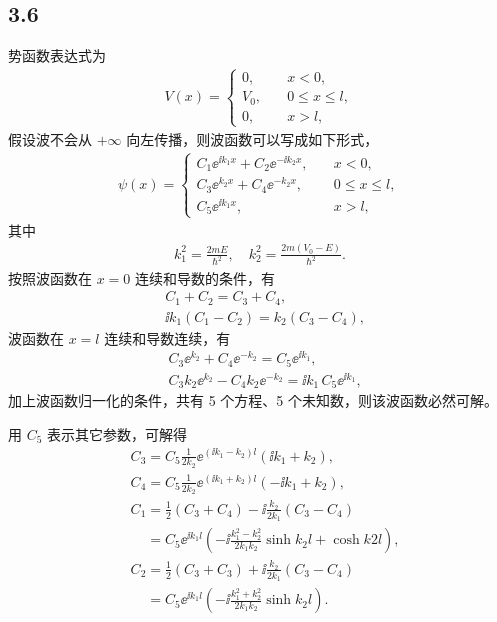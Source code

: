 \subsection{3.6}
势函数表达式为
\begin{align}
    V(x) = \begin{cases}
        0, \quad &x <0,\\
        V_0, \quad &0\leq x \leq l, \\
        0, \quad &x>l,
    \end{cases}
\end{align}
假设波不会从 $+\infty$ 向左传播，则波函数可以写成如下形式，
\begin{align}
    \psi(x) = \begin{cases}
        C_1 \ee^{\ii k_1 x} + C_2 \ee^{-\ii k_2 x}, \quad &x < 0, \\
        C_3 \ee^{k_2 x} + C_4 \ee^{-k_2 x}, \quad& 0\leq x \leq l,\\
        C_5 \ee^{\ii k_1 x}, \quad&x>l,
    \end{cases}
\end{align}
其中
\begin{align}
    k_1^2 = \frac{2mE}{\hbar^2}, \quad k_2^2 = \frac{2m(V_0 - E)}{\hbar^2}. 
\end{align}
按照波函数在 $x=0$ 连续和导数的条件，有
\begin{align}
    &C_1 + C_2 = C_3 + C_4, \\
    &\ii k_1 (C_1 - C_2) = k_2 (C_3 - C_4),
\end{align}
波函数在 $x=l$ 连续和导数连续，有
\begin{align}
    &C_3 \ee^{k_2} + C_4 \ee^{-k_2} = C_5 \ee^{\ii k_1},\\
    &C_3 k_2 \ee^{k_2} - C_4 k_2 \ee^{-k_2} = \ii k_1\, C_5 \ee^{\ii k_1},
\end{align}
加上波函数归一化的条件，共有 5 个方程、5 个未知数，则该波函数必然可解。

用 $C_5$ 表示其它参数，可解得
\begin{align}
    &C_3 = C_5 \frac1{2k_2} \ee^{(\ii k_1 - k_2)l} (\ii k_1 + k_2), \\
    &C_4 = C_5 \frac1{2k_2} \ee^{(\ii k_1 + k_2)l} (-\ii k_1 + k_2), \\
    &C_1 = \frac12(C_3 + C_4) - \ii \frac{k_2}{2k_1} (C_3 - C_4) \\
    &\phantom{C_1} = C_5 \ee^{\ii k_1 l} 
    \left(
         - \ii \frac{k_1^2 - k_2^2}{2k_1k_2} \sinh k_2 l
         + \cosh k2 l
    \right),
    \\
    &C_2 = \frac12(C_3 + C_3) + \ii \frac{k_2}{2k_1} (C_3 - C_4) \\
    &\phantom{C_2} = C_5 \ee^{\ii k_1 l} \left(
        -\ii \frac{k_1^2 + k_2^2}{2k_1k_2} \sinh k_2 l
    \right).
\end{align}


